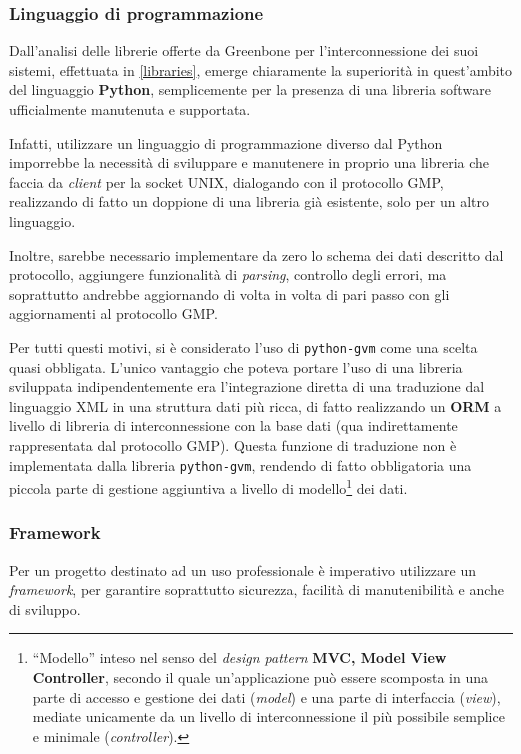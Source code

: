 \subsubsection{Linguaggio di programmazione}
Dall'analisi delle librerie offerte da Greenbone per l'interconnessione dei suoi sistemi, effettuata in \ref{libraries}, emerge chiaramente la superiorità in quest'ambito del linguaggio \textbf{Python}, semplicemente per la presenza di una libreria software ufficialmente manutenuta e supportata.

Infatti, utilizzare un linguaggio di programmazione diverso dal Python imporrebbe la necessità di sviluppare e manutenere in proprio una libreria che faccia da \emph{client} per la socket UNIX, dialogando con il protocollo GMP, realizzando di fatto un doppione di una libreria già esistente, solo per un altro linguaggio.

Inoltre, sarebbe necessario implementare da zero lo schema dei dati descritto dal protocollo, aggiungere funzionalità di \emph{parsing}, controllo degli errori, ma soprattutto andrebbe aggiornando di volta in volta di pari passo con gli aggiornamenti al protocollo GMP.

Per tutti questi motivi, si è considerato l'uso di \texttt{python-gvm} come una scelta quasi obbligata. L'unico vantaggio che poteva portare l'uso di una libreria sviluppata indipendentemente era l'integrazione diretta di una traduzione dal linguaggio XML in una struttura dati più ricca, di fatto realizzando un \textbf{ORM} a livello di libreria di interconnessione con la base dati (qua indirettamente rappresentata dal protocollo GMP). Questa funzione di traduzione non è implementata dalla libreria \texttt{python-gvm}, rendendo di fatto obbligatoria una piccola parte di gestione aggiuntiva a livello di modello\footnote{``Modello'' inteso nel senso del \emph{design pattern} \textbf{MVC, Model View Controller}, secondo il quale un'applicazione può essere scomposta in una parte di accesso e gestione dei dati (\emph{model}) e una parte di interfaccia (\emph{view}), mediate unicamente da un livello di interconnessione il più possibile semplice e minimale (\emph{controller}).} dei dati.

\subsubsection{Framework}
Per un progetto destinato ad un uso professionale è imperativo utilizzare un \emph{framework}, per garantire soprattutto sicurezza, facilità di manutenibilità e anche di sviluppo.

